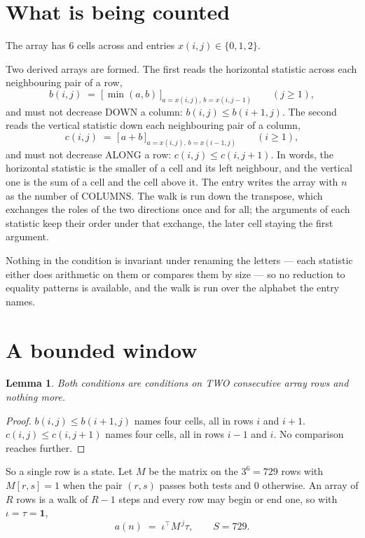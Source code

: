 \documentclass[11pt,a4paper]{article}
\theoremstyle{plain}
\newtheorem{lemma}[theorem]{Lemma}
\theoremstyle{definition}
\begin{document}
\section{What is being counted}

The array has $6$ cells across and entries $x(i,j)\in\{0,1,2\}$.

Two derived arrays are formed. The first reads the horizontal statistic across each
neighbouring pair of a row,
\[
b(i,j)\;=\;\bigl[\,\min(a,b)\,\bigr]_{a=x(i,j),\,b=x(i,j-1)}\qquad (j\ge1),
\]
and must not decrease DOWN a column: $b(i,j)\le b(i{+}1,j)$. The second reads the vertical
statistic down each neighbouring pair of a column,
\[
c(i,j)\;=\;\bigl[\,a+b\,\bigr]_{a=x(i,j),\,b=x(i{-}1,j)}\qquad (i\ge1),
\]
and must not decrease ALONG a row: $c(i,j)\le c(i,j{+}1)$. In words, the horizontal statistic
is the smaller of a cell and its left neighbour, and the vertical one is
the sum of a cell and the cell above it. The entry writes the array with $n$ as the number of COLUMNS. The walk is run down the transpose, which exchanges the roles of the two directions once and for all; the arguments of each statistic keep their order under that exchange, the later cell staying the first argument.

Nothing in the condition is invariant under renaming the letters --- each statistic either does
arithmetic on them or compares them by size --- so no reduction to equality patterns is
available, and the walk is run over the alphabet the entry names.

\section{A bounded window}

\begin{lemma}\label{lem:win}
Both conditions are conditions on TWO consecutive array rows and nothing more.
\end{lemma}

\begin{proof}
$b(i,j)\le b(i{+}1,j)$ names four cells, all in rows $i$ and $i+1$. $c(i,j)\le c(i,j{+}1)$
names four cells, all in rows $i-1$ and $i$. No comparison reaches further.
\end{proof}

So a single row is a state. Let $M$ be the matrix on the $3^{6}=729$ rows with
$M[r,s]=1$ when the pair $(r,s)$ passes both tests and $0$ otherwise. An array of $R$ rows is a
walk of $R-1$ steps and every row may begin or end one, so with $\iota=\tau=\mathbf{1}$,
\[
a(n)\;=\;\iota^{\!\top}M^{\,j}\tau ,\qquad S=729.
\]
\end{document}
